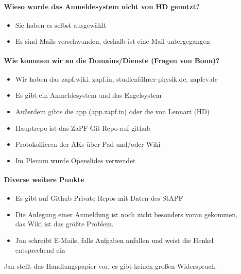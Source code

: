     \paragraph{Wieso wurde das Anmeldesystem nicht von HD genutzt?}
      \begin{itemize}
        \item Sie haben es selbst ausgewählt
        \item Es sind Mails verschwunden, deshalb ist eine Mail untergegangen
      \end{itemize}

    \paragraph{Wie kommen wir an die Domains/Dienste (Fragen von Bonn)?}
      \begin{itemize}
        \item Wir haben das zapf.wiki, zapf.in, studienführer-physik.de, zapfev.de
        \item Es gibt ein Anmeldesystem und das Engelsystem
        \item Außerdem gibts die app (app.zapf.in) oder die von Lennart (HD)
        \item Hauptrepo ist das ZaPF-Git-Repo auf github
        \item Protokollieren der AKs über Pad und/oder Wiki
        \item Im Plenum wurde Openslides verwendet
      \end{itemize}
    \paragraph{Diverse weitere Punkte}
      \begin{itemize}
        \item Es gibt auf Github Private Repos mit Daten des StAPF
        \item Die Anlegung einer Anmeldung ist noch nicht besonders voran gekommen, das Wiki ist das größte Problem.
        \item Jan schreibt E-Mails, falls Aufgaben anfallen und weist die Henkel entsprechend ein
      \end{itemize}
      
      Jan stellt das Handlungspapier vor, es gibt keinen großen Widerspruch.
